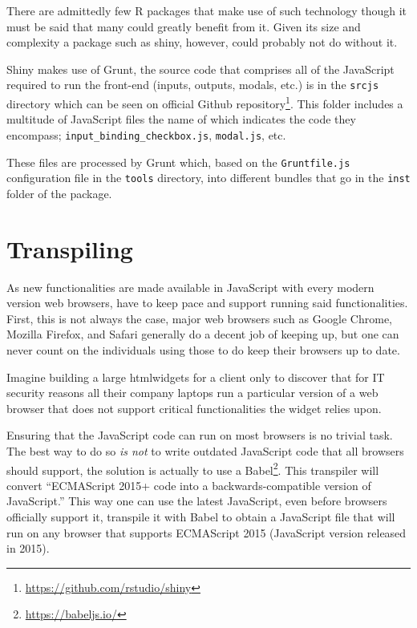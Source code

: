 \documentclass[
  10pt,
]{krantz}
\renewcommand{\href}[2]{#2\footnote{\url{#1}}}
\begin{document}
There are admittedly few R packages that make use of such technology though it must be said that many could greatly benefit from it. Given its size and complexity a package such as shiny, however, could probably not do without it.

Shiny makes use of Grunt, the source code that comprises all of the JavaScript required to run the front-end (inputs, outputs, modals, etc.) is in the \texttt{srcjs} directory which can be seen on \href{https://github.com/rstudio/shiny}{official Github repository}. This folder includes a multitude of JavaScript files the name of which indicates the code they encompass; \texttt{input\_binding\_checkbox.js}, \texttt{modal.js}, etc.

These files are processed by Grunt which, based on the \texttt{Gruntfile.js} configuration file in the \texttt{tools} directory, into different bundles that go in the \texttt{inst} folder of the package.

\hypertarget{webpack-browser}{%
\section{Transpiling}\label{webpack-browser}}

As new functionalities are made available in JavaScript with every modern version web browsers, have to keep pace and support running said functionalities. First, this is not always the case, major web browsers such as Google Chrome, Mozilla Firefox, and Safari generally do a decent job of keeping up, but one can never count on the individuals using those to do keep their browsers up to date.

Imagine building a large htmlwidgets for a client only to discover that for IT security reasons all their company laptops run a particular version of a web browser that does not support critical functionalities the widget relies upon.

Ensuring that the JavaScript code can run on most browsers is no trivial task. The best way to do so \emph{is not} to write outdated JavaScript code that all browsers should support, the solution is actually to use a \href{https://babeljs.io/}{Babel}. This transpiler will convert ``ECMAScript 2015+ code into a backwards-compatible version of JavaScript.'' This way one can use the latest JavaScript, even before browsers officially support it, transpile it with Babel to obtain a JavaScript file that will run on any browser that supports ECMAScript 2015 (JavaScript version released in 2015).
\end{document}
